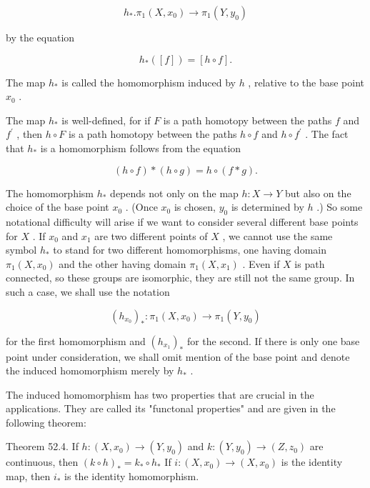 \documentclass[10pt]{article}
\begin{document}
\[
{h}_{ * }.{\pi }_{1}\left( {X,{x}_{0}}\right)  \rightarrow  {\pi }_{1}\left( {Y,{y}_{0}}\right)
\]

by the equation

\[
{h}_{ * }\left( \left\lbrack  f\right\rbrack  \right)  = \left\lbrack  {h \circ  f}\right\rbrack  .
\]

The map \({h}_{ * }\) is called the homomorphism induced by \(h\) , relative to the base point \({x}_{0}\) .

The map \({h}_{ * }\) is well-defined, for if \(F\) is a path homotopy between the paths \(f\) and \({f}^{\prime }\) , then \(h \circ  F\) is a path homotopy between the paths \(h \circ  f\) and \(h \circ  {f}^{\prime }\) . The fact that \({h}_{ * }\) is a homomorphism follows from the equation

\[
\left( {h \circ  f}\right)  * \left( {h \circ  g}\right)  = h \circ  \left( {f * g}\right) .
\]

The homomorphism \({h}_{ * }\) depends not only on the map \(h : X \rightarrow  Y\) but also on the choice of the base point \({x}_{0}\) . (Once \({x}_{0}\) is chosen, \({y}_{0}\) is determined by \(h\) .) So some notational difficulty will arise if we want to consider several different base points for \(X\) . If \({x}_{0}\) and \({x}_{1}\) are two different points of \(X\) , we cannot use the same symbol \({h}_{ * }\) to stand for two different homomorphisms, one having domain \({\pi }_{1}\left( {X,{x}_{0}}\right)\) and the other having domain \({\pi }_{1}\left( {X,{x}_{1}}\right)\) . Even if \(X\) is path connected, so these groups are isomorphic, they are still not the same group. In such a case, we shall use the notation

\[
{\left( {h}_{{x}_{0}}\right) }_{ * } : {\pi }_{1}\left( {X,{x}_{0}}\right)  \rightarrow  {\pi }_{1}\left( {Y,{y}_{0}}\right)
\]

for the first homomorphism and \({\left( {h}_{{x}_{1}}\right) }_{ * }\) for the second. If there is only one base point under consideration, we shall omit mention of the base point and denote the induced homomorphism merely by \({h}_{ * }\) .

The induced homomorphism has two properties that are crucial in the applications. They are called its "functonal properties" and are given in the following theorem:

Theorem 52.4. If \(h : \left( {X,{x}_{0}}\right)  \rightarrow  \left( {Y,{y}_{0}}\right)\) and \(k : \left( {Y,{y}_{0}}\right)  \rightarrow  \left( {Z,{z}_{0}}\right)\) are continuous, then \({\left( k \circ  h\right) }_{ * } = {k}_{ * } \circ  {h}_{ * }\) If \(i : \left( {X,{x}_{0}}\right)  \rightarrow  \left( {X,{x}_{0}}\right)\) is the identity map, then \({i}_{ * }\) is the identity homomorphism.
\end{document}

